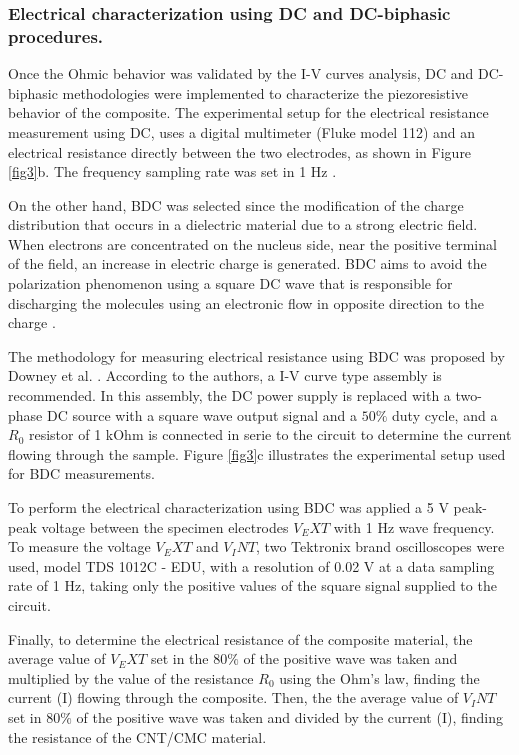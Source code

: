\documentclass[twocolumn]{bmcart}%
\begin{document}
\subsubsection{Electrical characterization using DC and DC-biphasic procedures.}

Once the Ohmic behavior was validated by the I-V curves analysis, DC and DC-biphasic methodologies were implemented to characterize the piezoresistive behavior of the composite. The experimental setup for the electrical resistance measurement using DC, uses a digital multimeter (Fluke model 112) and an electrical resistance directly between the two electrodes, as shown in Figure \ref{fig3}b. The frequency  sampling rate was set in 1 Hz \cite{Downey2017, Coppola2011, Dong2016}.

On the other hand, BDC was selected since the modification of the charge distribution that occurs in a dielectric material due to a strong electric field. When electrons are concentrated on the nucleus side, near the positive terminal of the field, an increase in electric charge is generated. BDC aims to avoid the polarization phenomenon using a square DC wave that is responsible for discharging the molecules using an electronic flow in opposite direction to the charge \cite{Downey2017a, BOTTCHER1973}.

The methodology for measuring electrical resistance using BDC was proposed by  Downey et al. \cite{Downey2017a}. According to the authors, a I-V curve type assembly is recommended. In this assembly, the DC power supply is replaced with a two-phase DC source with a square wave output signal and a $50\%$ duty cycle, and a $R_0$ resistor of 1 kOhm is connected in serie to the circuit to determine the current flowing through the sample. Figure \ref{fig3}c illustrates the experimental setup used for BDC measurements.

To perform the electrical characterization using BDC was applied a 5 V peak-peak voltage between the specimen electrodes $V_EXT$ with 1 Hz wave frequency. To measure the voltage $V_EXT$ and $V_INT$, two Tektronix brand oscilloscopes were used, model TDS 1012C - EDU, with a resolution of 0.02 V at a data sampling rate of 1 Hz, taking only the positive values of the square signal supplied to the circuit.

Finally, to determine the electrical resistance of the composite material, the average value of $V_EXT$ set in the $80\%$ of the positive wave was taken and multiplied by the value of the resistance $R_0$ using the Ohm's law, finding the current (I) flowing through the composite. Then, the the average value of $V_INT$ set in $80\%$ of the positive wave was taken and divided by the current (I), finding the resistance of the CNT/CMC material.
\end{document}
